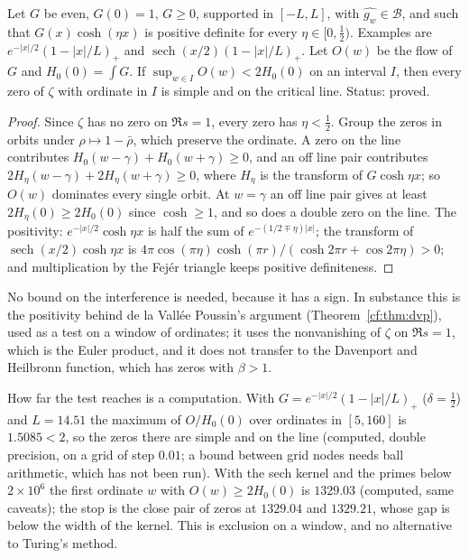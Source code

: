 \begin{theorem}\label{cm:thm:height}
Let $G$ be even, $G(0)=1$, $G\ge0$, supported in $[-L,L]$, with $\widehat{g_w}\in\mathcal B$, and such that $G(x)\cosh(\eta x)$ is positive definite for every $\eta\in[0,\frac12)$. Examples are $e^{-|x|/2}(1-|x|/L)_+$ and $\operatorname{sech}(x/2)(1-|x|/L)_+$. Let $O(w)$ be the flow of $G$ and $H_0(0)=\int G$. If $\sup_{w\in I}O(w)<2H_0(0)$ on an interval $I$, then every zero of $\zeta$ with ordinate in $I$ is simple and on the critical line. Status: proved.
\end{theorem}

\begin{proof}
Since $\zeta$ has no zero on $\Re s=1$, every zero has $\eta<\frac12$. Group the zeros in orbits under $\rho\mapsto1-\bar\rho$, which preserve the ordinate. A zero on the line contributes $H_0(w-\gamma)+H_0(w+\gamma)\ge0$, and an off line pair contributes $2H_\eta(w-\gamma)+2H_\eta(w+\gamma)\ge0$, where $H_\eta$ is the transform of $G\cosh\eta x$; so $O(w)$ dominates every single orbit. At $w=\gamma$ an off line pair gives at least $2H_\eta(0)\ge2H_0(0)$ since $\cosh\ge1$, and so does a double zero on the line. The positivity: $e^{-|x|/2}\cosh\eta x$ is half the sum of $e^{-(1/2\mp\eta)|x|}$; the transform of $\operatorname{sech}(x/2)\cosh\eta x$ is $4\pi\cos(\pi\eta)\cosh(\pi r)/(\cosh2\pi r+\cos2\pi\eta)>0$; and multiplication by the Fej\'er triangle keeps positive definiteness.
\end{proof}

No bound on the interference is needed, because it has a sign. In substance this is the positivity behind de la Vall\'ee Poussin's argument (Theorem~\ref{cf:thm:dvp}), used as a test on a window of ordinates; it uses the nonvanishing of $\zeta$ on $\Re s=1$, which is the Euler product, and it does not transfer to the Davenport and Heilbronn function, which has zeros with $\beta>1$.

How far the test reaches is a computation. With $G=e^{-|x|/2}(1-|x|/L)_+$ ($\delta=\frac12$) and $L=14.51$ the maximum of $O/H_0(0)$ over ordinates in $[5,160]$ is $1.5085<2$, so the zeros there are simple and on the line (computed, double precision, on a grid of step $0.01$; a bound between grid nodes needs ball arithmetic, which has not been run). With the sech kernel and the primes below $2\times10^6$ the first ordinate $w$ with $O(w)\ge2H_0(0)$ is $1329.03$ (computed, same caveats); the stop is the close pair of zeros at $1329.04$ and $1329.21$, whose gap is below the width of the kernel. This is exclusion on a window, and no alternative to Turing's method.

